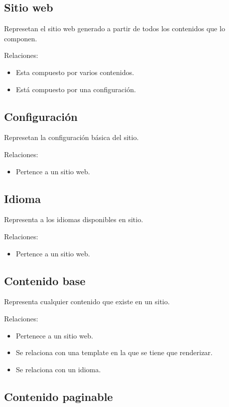 \subsection{Sitio web}

Represetan el sitio web generado a partir de todos los contenidos que lo componen.

Relaciones:
\begin{itemize}
    \item Esta compuesto por varios contenidos.
    \item Está compuesto por una configuración.
\end{itemize}

\subsection{Configuración}

Represetan la configuración básica del sitio.

Relaciones:
\begin{itemize}
    \item Pertence a un sitio web.
\end{itemize}

\subsection{Idioma}

Representa a los idiomas disponibles en sitio.

Relaciones:
\begin{itemize}
    \item Pertence a un sitio web.
\end{itemize}

\subsection{Contenido base}

Representa cualquier contenido que existe en un sitio.

Relaciones:
\begin{itemize}
    \item Pertenece a un sitio web.
    \item Se relaciona con una template en la que se tiene que renderizar.
    \item Se relaciona con un idioma.
\end{itemize}

\subsection{Contenido paginable}

